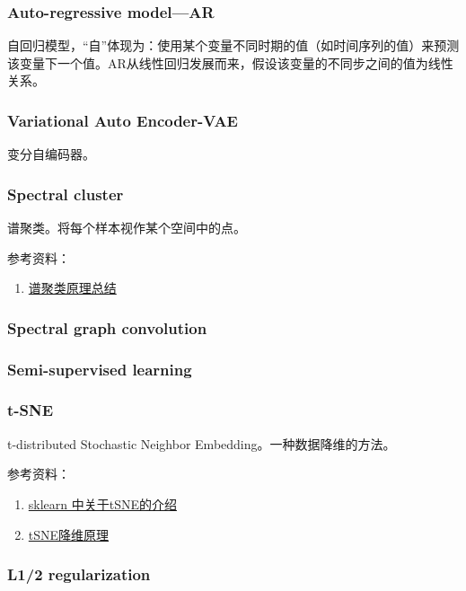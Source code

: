 \subsubsection{Auto-regressive model---AR}
自回归模型，“自”体现为：使用某个变量不同时期的值（如时间序列的值）来预测该变量下一个值。AR从线性回归发展而来，假设该变量的不同步之间的值为线性关系。

\subsubsection{Variational Auto Encoder-VAE}
变分自编码器。

\subsubsection{Spectral cluster}
谱聚类。将每个样本视作某个空间中的点。

参考资料：
\begin{enumerate}
    \item \href{https://www.cnblogs.com/pinard/p/6221564.htm}{谱聚类原理总结}
\end{enumerate}


\subsubsection{Spectral graph convolution}


\subsubsection{Semi-supervised learning }

\subsubsection{t-SNE}
t-distributed Stochastic Neighbor Embedding。一种数据降维的方法。

参考资料：
\begin{enumerate}
    \item \href{https://scikit-learn.org/stable/modules/manifold.html#t-distributed-stochastic-neighbor-embedding-t-sne}{sklearn 中关于tSNE的介绍}
    \item \href{https://www.jianshu.com/p/700f017cd330}{tSNE降维原理}
\end{enumerate}


\subsubsection{L1/2 regularization}

